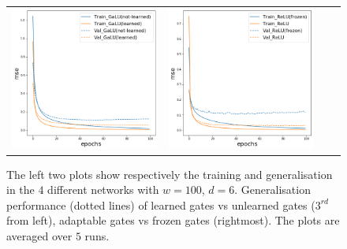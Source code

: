 \begin{figure}
{\begin{tabular}{cccc}
\includegraphics[scale=0.1]{figs/galu-learn-no-learn.png}
&
\includegraphics[scale=0.1]{figs/relu-froze-no-froze.png}

\end{tabular}
}
\caption{The left two plots show respectively the training and generalisation in the $4$ different networks with $w=100$, $d=6$. Generalisation performance (dotted lines) of learned gates vs unlearned gates ($3^{rd}$ from left), adaptable gates vs frozen gates (rightmost). The plots are averaged over $5$ runs. }
\label{fig:adapt}
\end{figure}


